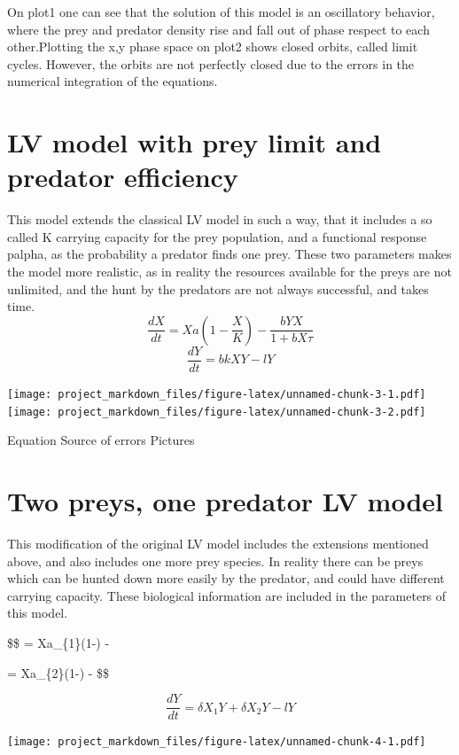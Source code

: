 \documentclass[]{article}
\begin{document}
On plot1 one can see that the solution of this model is an oscillatory
behavior, where the prey and predator density rise and fall out of phase
respect to each other.Plotting the x,y phase space on plot2 shows closed
orbits, called limit cycles. However, the orbits are not perfectly
closed due to the errors in the numerical integration of the equations.

\section{LV model with prey limit and predator
efficiency}\label{lv-model-with-prey-limit-and-predator-efficiency}

This model extends the classical LV model in such a way, that it
includes a so called K carrying capacity for the prey population, and a
functional response palpha, as the probability a predator finds one
prey. These two parameters makes the model more realistic, as in reality
the resources available for the preys are not unlimited, and the hunt by
the predators are not always successful, and takes time. \[
\frac{dX}{dt} = Xa(1-\frac{X}{K}) - \frac{bYX}{1+bX\tau}
\] \[
\frac{dY}{dt}= bkXY-lY
\]

\texttt{[image: project\_markdown\_files/figure-latex/unnamed-chunk-3-1.pdf]}
\texttt{[image: project\_markdown\_files/figure-latex/unnamed-chunk-3-2.pdf]}

Equation Source of errors Pictures

\section{Two preys, one predator LV
model}\label{two-preys-one-predator-lv-model}

This modification of the original LV model includes the extensions
mentioned above, and also includes one more prey species. In reality
there can be preys which can be hunted down more easily by the predator,
and could have different carrying capacity. These biological information
are included in the parameters of this model.

\$\$  = Xa\_\{1\}(1-) -

\[
\]  = Xa\_\{2\}(1-) -
 \$\$

\[
\frac{dY}{dt}= \delta X_{1}Y + \delta X_{2}Y-lY
\]

\texttt{[image: project\_markdown\_files/figure-latex/unnamed-chunk-4-1.pdf]}
\end{document}

